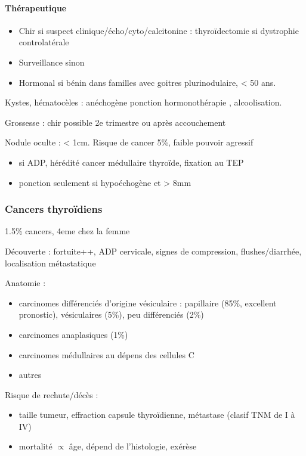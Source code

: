 \documentclass[11pt]{article}
\begin{document}
\paragraph{Thérapeutique}
\label{sec:orgd615fbd}
\begin{itemize}
\item Chir si suspect clinique/écho/cyto/calcitonine \inc\inc{} : thyroïdectomie si dystrophie controlatérale
\item Surveillance sinon
\item Hormonal si bénin dans familles avec goitres plurinodulaire, < 50 ans.
\end{itemize}

Kystes, hématocèles : anéchogène \thus ponction \textpm{} hormonothérapie , alcoolisation.

Grossesse : chir possible 2e trimestre ou après accouchement 

Nodule oculte : < 1cm. Risque de cancer 5\%, faible pouvoir agressif
\begin{itemize}
\item \danger si ADP, hérédité cancer médullaire thyroïde, fixation au TEP
\item ponction seulement si hypoéchogène et > 8mm
\end{itemize}
\subsubsection{Cancers thyroïdiens}
\label{sec:org937f977}
1.5\% cancers, 4eme chez la femme

Découverte : fortuite++, ADP cervicale, signes de compression, flushes/diarrhée,
localisation métastatique

Anatomie :
\begin{itemize}
\item carcinomes différenciés d'origine vésiculaire : papillaire (85\%, excellent
pronostic), vésiculaires (5\%), peu différenciés (2\%)
\item carcinomes anaplasiques (1\%)
\item carcinomes médullaires au dépens des cellules C
\item autres
\end{itemize}

Risque de rechute/décès : 
\begin{itemize}
\item taille tumeur, effraction capsule thyroïdienne, métastase (clasif TNM de I à IV)
\item mortalité \(\propto\) âge, dépend de l'histologie, exérèse
\end{itemize}
\end{document}
